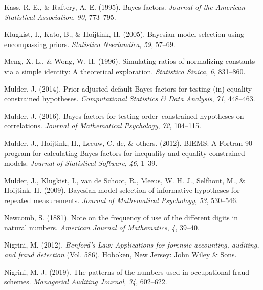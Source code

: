 \documentclass[
  english,
  man,floatsintext]{apa6}
\newlength{\cslhangindent}
\newenvironment{cslreferences}%
  {\setlength{\parindent}{0pt}%
  \everypar{\setlength{\hangindent}{\cslhangindent}}\ignorespaces}%
  {\par}
\begin{document}
\begin{cslreferences}
\leavevmode\hypertarget{ref-kass1995bayes}{}%
Kass, R. E., \& Raftery, A. E. (1995). Bayes factors. \emph{Journal of the American Statistical Association}, \emph{90}, 773--795.

\leavevmode\hypertarget{ref-klugkist2005bayesian}{}%
Klugkist, I., Kato, B., \& Hoijtink, H. (2005). Bayesian model selection using encompassing priors. \emph{Statistica Neerlandica}, \emph{59}, 57--69.

\leavevmode\hypertarget{ref-meng1996simulating}{}%
Meng, X.-L., \& Wong, W. H. (1996). Simulating ratios of normalizing constants via a simple identity: A theoretical exploration. \emph{Statistica Sinica}, \emph{6}, 831--860.

\leavevmode\hypertarget{ref-mulder2014prior}{}%
Mulder, J. (2014). Prior adjusted default Bayes factors for testing (in) equality constrained hypotheses. \emph{Computational Statistics \& Data Analysis}, \emph{71}, 448--463.

\leavevmode\hypertarget{ref-mulder2016bayes}{}%
Mulder, J. (2016). Bayes factors for testing order--constrained hypotheses on correlations. \emph{Journal of Mathematical Psychology}, \emph{72}, 104--115.

\leavevmode\hypertarget{ref-mulder2012biems}{}%
Mulder, J., Hoijtink, H., Leeuw, C. de, \& others. (2012). BIEMS: A Fortran 90 program for calculating Bayes factors for inequality and equality constrained models. \emph{Journal of Statistical Software}, \emph{46}, 1--39.

\leavevmode\hypertarget{ref-mulder2009bayesian}{}%
Mulder, J., Klugkist, I., van de Schoot, R., Meeus, W. H. J., Selfhout, M., \& Hoijtink, H. (2009). Bayesian model selection of informative hypotheses for repeated measurements. \emph{Journal of Mathematical Psychology}, \emph{53}, 530--546.

\leavevmode\hypertarget{ref-newcomb1881note}{}%
Newcomb, S. (1881). Note on the frequency of use of the different digits in natural numbers. \emph{American Journal of Mathematics}, \emph{4}, 39--40.

\leavevmode\hypertarget{ref-nigrini2012benford}{}%
Nigrini, M. (2012). \emph{Benford's Law: Applications for forensic accounting, auditing, and fraud detection} (Vol. 586). Hoboken, New Jersey: John Wiley \& Sons.

\leavevmode\hypertarget{ref-nigrini2019patterns}{}%
Nigrini, M. J. (2019). The patterns of the numbers used in occupational fraud schemes. \emph{Managerial Auditing Journal}, \emph{34}, 602--622.


\end{cslreferences}
\end{document}
